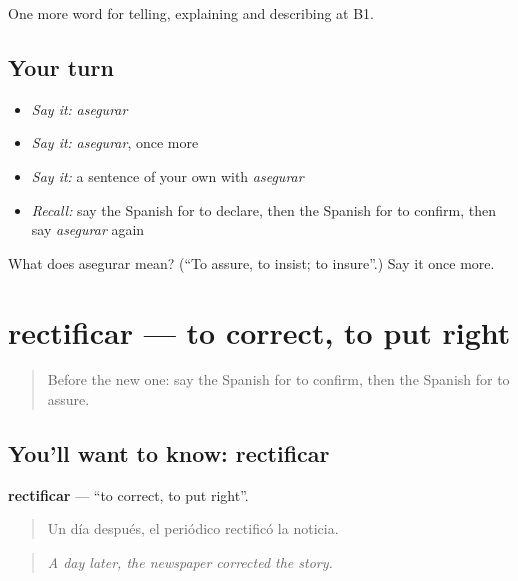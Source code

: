 \begin{grammarlens}[title={What you've built}]
One more word for telling, explaining and describing at B1.
\end{grammarlens}

\subsection*{Your turn}
\begin{itemize}
\raggedright
  \item \emph{Say it:} \emph{asegurar}
  \item \emph{Say it:} \emph{asegurar}, once more
  \item \emph{Say it:} a sentence of your own with \emph{asegurar}
  \item \emph{Recall:} say the Spanish for to declare, then the Spanish for to confirm, then say \emph{asegurar} again
\end{itemize}

\begin{tcolorbox}[breakable,colback=teal!4,colframe=teal!35!black,title={Before you move on}]
What does asegurar mean? (\textquotedblleft{}To assure, to insist; to insure\textquotedblright{}.) Say it once more.
\end{tcolorbox}
\section[rectificar]{rectificar — to correct, to put right}

\label{lesson:ES-C516-rectificar}



\begin{quote}
Before the new one: say the Spanish for to confirm, then the Spanish for to assure.
\end{quote}

\subsection*{You'll want to know: rectificar}
\textbf{rectificar} — \textquotedblleft{}to correct, to put right\textquotedblright{}.

\begin{quote}
Un día después, el periódico rectificó la noticia.
\end{quote}

\begin{quote}
\emph{A day later, the newspaper corrected the story.}
\end{quote}

